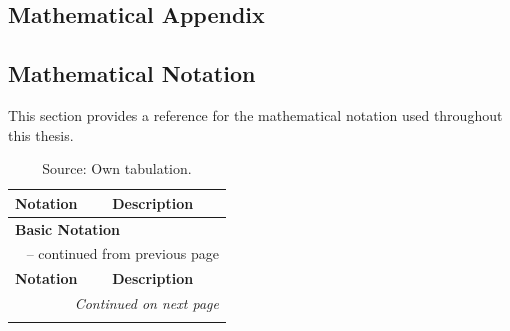 \begin{appendices}
  \chapter{Mathematical Appendix}
  \section{Mathematical Notation}
  \label{app:math_notation}

  This section provides a reference for the mathematical notation used throughout this thesis. 

  \begingroup
  \begin{longtable}{p{}p{}}
    \caption[Summary of Mathematical Notation]{Mathematical Notation} \label{tab:math_notation}                                        \\

    \toprule
    \textbf{Notation}                           & \textbf{Description}                                                                 \\
    \midrule
    \multicolumn{2}{l}{\textbf{Basic Notation}}                                                                                        \\
    \midrule
    \endfirsthead

    \multicolumn{2}{c}{\tablename\ \thetable{} -- continued from previous page}                                                        \\
    \toprule
    \textbf{Notation}                           & \textbf{Description}                                                                 \\
    \midrule
    \endhead

    \midrule
    \multicolumn{2}{r}{\textit{Continued on next page}}                                                                                \\
    \endfoot

    \bottomrule
    \caption*{Source: Own tabulation.}
    \endlastfoot


\end{longtable}
\end{appendices}
